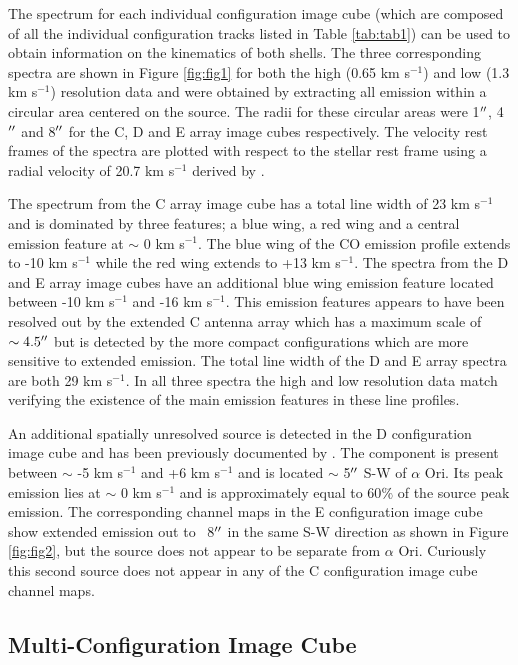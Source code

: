 \documentclass[manuscript]{aastex}
\begin{document}
The spectrum for each individual configuration image cube (which are composed of all the individual configuration tracks listed in Table \ref{tab:tab1}) can be used to obtain information on the kinematics of both shells. The three corresponding spectra are shown in Figure \ref{fig:fig1} for both the high (0.65 km s${}^{-1}$) and low (1.3 km s${}^{-1}$) resolution data and were obtained by extracting all emission within a circular area centered on the source. The radii for these circular areas were 1$\mbox{$^{\prime\prime}$}$, 4$\mbox{$^{\prime\prime}$}$ and 8$\mbox{$^{\prime\prime}$}$ for the C, D and E array image cubes respectively. The velocity rest frames of the spectra are plotted with respect to the stellar rest frame using a radial velocity of 20.7 km s${}^{-1}$  derived by \citet{harp08}.

The spectrum from the C array image cube has a total line width of 23 km s${}^{-1}$ and is dominated by three features; a blue wing, a red wing and a central emission feature at $\sim$ 0 km s${}^{-1}$. The blue wing of the CO emission profile extends to -10 km s${}^{-1}$ while the red wing extends to +13 km s${}^{-1}$. The spectra from the D and E array image cubes have an additional blue wing emission feature located between -10 km s${}^{-1}$ and -16 km s${}^{-1}$. This emission features appears to have been resolved out by the extended C antenna array which has a maximum scale of $\sim 4.5 \mbox{$^{\prime\prime}$}$ but is detected by the more compact configurations which are more sensitive to extended emission. The total line width of the D and E array spectra are both 29 km s${}^{-1}$. In all three spectra the high and low resolution data match verifying the existence of the main emission features in these line profiles.

An additional spatially unresolved source is detected in the D configuration image cube and has been previously documented by \citet{harp09}. The component is present between $\sim$ -5 km s${}^{-1}$ and +6 km s${}^{-1}$ and is located $\sim$ 5$\mbox{$^{\prime\prime}$}$ S-W of $\alpha$ Ori. Its peak emission lies at $\sim$ 0 km s${}^{-1}$ and is approximately equal to 60$\%$ of the source peak emission. The corresponding channel maps in the E configuration image cube show extended emission out to ~8$\mbox{$^{\prime\prime}$}$ in the same S-W direction as shown in Figure \ref{fig:fig2}, but the source does not appear to be separate from $\alpha$ Ori. Curiously this second source does not appear in any of the C configuration image cube channel maps. 


\subsection{Multi-Configuration Image Cube} \label{results2} 
\end{document}
